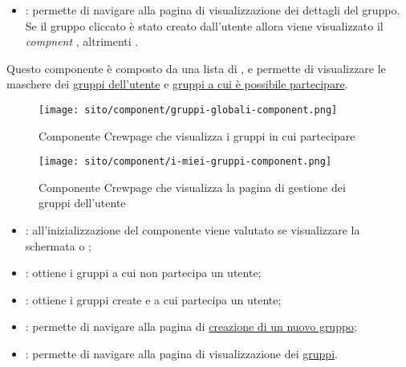 \begin{itemize}
    \item {}: permette di navigare alla pagina di visualizzazione dei dettagli del gruppo. Se il gruppo cliccato è stato creato dall'utente allora viene visualizzato il \textit{compnent} , altrimenti .
\end{itemize}

\label{par:Crewpage}
Questo componente è composto da una lista di , e permette di visualizzare le maschere dei \hyperref[par:Gruppi dell'utente]{gruppi dell'utente} e \hyperref[par:Gruppi]{gruppi a cui è possibile partecipare}.

\begin{figure}[H] 
    \centering 
    \texttt{[image: sito/component/gruppi-globali-component.png]} 
    \caption{Componente Crewpage che visualizza i gruppi in cui partecipare}
\end{figure}

\begin{figure}[H] 
    \centering 
    \texttt{[image: sito/component/i-miei-gruppi-component.png]} 
    \caption{Componente Crewpage che visualizza la pagina di gestione dei gruppi dell'utente}
\end{figure}


\begin{itemize}
    \item {}: all'inizializzazione del componente viene valutato se visualizzare la schermata  o ;
    \item {}: ottiene i gruppi a cui non partecipa un utente;
    \item {}:  ottiene i gruppi create e a cui partecipa un utente;
    \item {}: permette di navigare alla pagina di \hyperref[par:Crea nuovo gruppo]{creazione di un nuovo gruppo};
    \item {}: permette di navigare alla pagina di visualizzazione dei \hyperref[par:Gruppi]{gruppi}.
\end{itemize}



